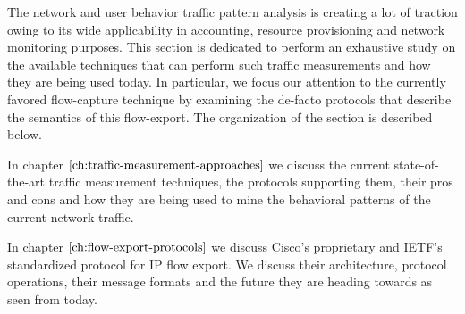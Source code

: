 The network and user behavior traffic pattern analysis is creating a lot of
traction owing to its wide applicability in accounting, resource provisioning
and network monitoring purposes. This section is dedicated to perform an
exhaustive study on the available techniques that can perform such traffic
measurements and how they are being used today. In particular, we focus our
attention to the currently favored flow-capture technique by examining the
de-facto protocols that describe the semantics of this flow-export. The
organization of the section is described below.

\vspace{50pt}

In chapter $\ref{ch:traffic-measurement-approaches}$ we discuss the current
state-of-the-art traffic measurement techniques, the protocols supporting
them, their pros and cons and how they are being used to mine the behavioral
patterns of the current network traffic. 

In chapter $\ref{ch:flow-export-protocols}$ we discuss Cisco's proprietary and
\ac{IETF}'s standardized protocol for \ac{IP} flow export. We discuss their
architecture, protocol operations, their message formats and the future they
are heading towards as seen from today.

